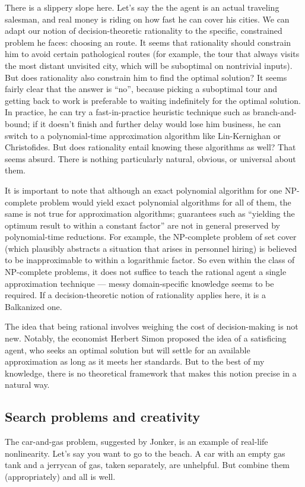 \documentclass[letterpaper,12pt]{article}
\begin{document}
There is a slippery slope here. Let's say the the agent is an actual traveling salesman, and real money is riding on how fast he can cover his cities. We can adapt our notion of decision-theoretic rationality to the specific, constrained problem he faces: choosing an route. It seems that rationality should constrain him to avoid certain pathological routes (for example, the tour that always visits the most distant unvisited city, which will be suboptimal on nontrivial inputs). But does rationality also constrain him to find the optimal solution? It seems fairly clear that the answer is ``no'', because picking a suboptimal tour and getting back to work is preferable to waiting indefinitely for the optimal solution. In practice, he can try a fast-in-practice heuristic technique such as branch-and-bound; if it doesn't finish and further delay would lose him business, he can switch to a polynomial-time approximation algorithm like Lin-Kernighan or Christofides. But does rationality entail knowing these algorithms as well? That seems absurd. There is nothing particularly natural, obvious, or universal about them.

It is important to note that although an exact polynomial algorithm for one NP-complete problem would yield exact polynomial algorithms for all of them, the same is not true for approximation algorithms; guarantees such as ``yielding the optimum result to within a constant factor'' are not in general preserved by polynomial-time reductions. For example, the NP-complete problem of set cover (which plausibly abstracts a situation that arises in personnel hiring) is believed to be inapproximable to within a logarithmic factor. So even within the class of NP-complete problems, it does not suffice to teach the rational agent a single approximation technique --- messy domain-specific knowledge seems to be required. If a decision-theoretic notion of rationality applies here, it is a Balkanized one.

The idea that being rational involves weighing the cost of decision-making is not new. Notably, the economist Herbert Simon proposed the idea of a satisficing agent, who seeks an optimal solution but will settle for an available approximation as long as it meets her standards. But to the best of my knowledge, there is no theoretical framework that makes this notion precise in a natural way.

\subsection{Search problems and creativity}
The car-and-gas problem, suggested by Jonker, is an example of real-life nonlinearity. Let's say you want to go to the beach. A car with an empty gas tank and a jerrycan of gas, taken separately, are unhelpful. But combine them (appropriately) and all is well.
\end{document}
